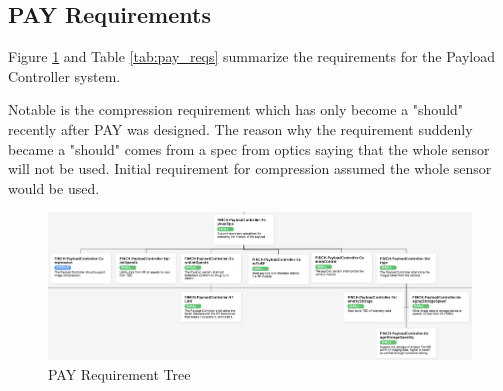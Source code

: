 \documentclass[12pt,a4paper]{article}
\begin{document}
    \subsection{PAY Requirements}
Figure \ref{fig:PAY_req_tree} and Table \ref{tab:pay_reqs}
summarize the requirements for the Payload Controller system. 

Notable is the compression requirement which has only become a "should" recently after PAY was designed. The reason why the requirement suddenly became a "should" comes from a spec from optics saying that the whole sensor will not be used. Initial requirement for compression assumed the whole sensor would be used. 
    \begin{figure}[H]
        \centering
        \includegraphics[width=1\linewidth]{../figures/PAY_req_tree.png}
        \caption{PAY Requirement Tree}
        \label{fig:PAY_req_tree}
    \end{figure}
\end{document}
